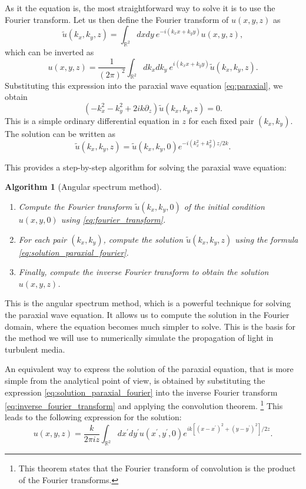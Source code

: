 \documentclass[a4paper,10pt]{report}
\newtheorem{alg}{Algorithm}
\begin{document}
As it the equation is, the most straightforward way to solve it is to use the Fourier transform. Let us then define the Fourier transform of $u(x,y,z)$ as
\begin{equation}
\label{eq:fourier_transform}
    \tilde{u}(k_x, k_y,z) = \int_{\mathbb{R}^2} dx dy \ e^{-i(k_x x + k_y y)} u(x,y,z),
\end{equation}
which can be inverted as
\begin{equation}
\label{eq:inverse_fourier_transform}
    u(x,y,z) = \frac{1}{(2\pi)^2} \int_{\mathbb{R}^2} dk_x dk_y \ e^{i(k_x x + k_y y)} \tilde{u}(k_x, k_y,z).
\end{equation}
Substituting this expression into the paraxial wave equation \eqref{eq:paraxial}, we obtain
\begin{equation}
    \left( -k_x^2 - k_y^2 + 2ik \partial_z \right) \tilde{u}(k_x, k_y,z) = 0.
\end{equation}
This is a simple ordinary differential equation in $z$ for each fixed pair $(k_x, k_y)$. The solution can be written as
\begin{equation}
\label{eq:solution_paraxial_fourier}
    \tilde{u}(k_x, k_y,z) = \tilde{u}(k_x, k_y,0) e^{-i(k_x^2 + k_y^2)z/2k}.
\end{equation}

This provides a step-by-step algorithm for solving the paraxial wave equation:
\begin{alg}[Angular spectrum method]
\leavevmode
\begin{enumerate}
    \item Compute the Fourier transform $\tilde{u}(k_x, k_y,0)$ of the initial condition $u(x,y,0)$ using \eqref{eq:fourier_transform}.
    \item For each pair $(k_x, k_y)$, compute the solution $\tilde{u}(k_x, k_y,z)$ using the formula \eqref{eq:solution_paraxial_fourier}.
    \item Finally, compute the inverse Fourier transform to obtain the solution $u(x,y,z)$.
\end{enumerate}
\end{alg}

This is the angular spectrum method, which is a powerful technique for solving the paraxial wave equation. It allows us to compute the solution in the Fourier domain, where the equation becomes much simpler to solve. This is the basis for the method we will use to numerically simulate the propagation of light in turbulent media.

An equivalent way to express the solution of the paraxial equation, that is more simple from the analytical point of view, is obtained by substituting the expression \eqref{eq:solution_paraxial_fourier} into the inverse Fourier transform \eqref{eq:inverse_fourier_transform} and applying the convolution theorem. \footnote{This theorem states that the Fourier transform of convolution is the product of the Fourier transforms.} This leads to the following expression for the solution:
\begin{equation}
\label{eq:fresnel_diffraction}
    u(x,y,z) = \frac{k}{2\pi i z} \int_{\mathbb{R}^2} dx^\prime dy^\prime u(x^\prime,y^\prime,0) e^{ik\left[ (x-x^\prime)^2 + (y-y^\prime)^2 \right] / 2z}.
\end{equation}
\end{document}
